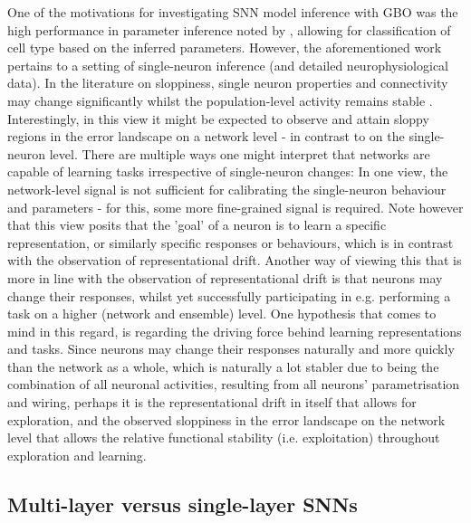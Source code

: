 \documentclass[mphil,deptreport,ianc]{infthesis} %
\begin{document}
One of the motivations for investigating SNN model inference with GBO was the high performance in parameter inference noted by \cite{Teeter2018a}, allowing for classification of cell type based on the inferred parameters.
However, the aforementioned work pertains to a setting of single-neuron inference (and detailed neurophysiological data).
In the literature on sloppiness, single neuron properties and connectivity may change significantly whilst the population-level activity remains stable \cite{Panas2015SloppinessNetworks}.
Interestingly, in this view it might be expected to observe and attain sloppy regions in the error landscape on a network level - in contrast to on the single-neuron level.
There are multiple ways one might interpret that networks are capable of learning tasks irrespective of single-neuron changes: 
In one view, the network-level signal is not sufficient for calibrating the single-neuron behaviour and parameters - for this, some more fine-grained signal is required. Note however that this view posits that the 'goal' of a neuron is to learn a specific representation, or similarly specific responses or behaviours, which is in contrast with the observation of representational drift.
Another way of viewing this that is more in line with the observation of representational drift is that neurons may change their responses, whilst yet successfully participating in e.g. performing a task on a higher (network and ensemble) level.
One hypothesis that comes to mind in this regard, is regarding the driving force behind learning representations and tasks.
Since neurons may change their responses naturally and more quickly than the network as a whole, which is naturally a lot stabler due to being the combination of all neuronal activities, resulting from all neurons' parametrisation and wiring, perhaps it is the representational drift in itself that allows for exploration, and the observed sloppiness in the error landscape on the network level that allows the relative functional stability (i.e. exploitation) throughout exploration and learning.


\subsection*{Multi-layer versus single-layer SNNs}
\end{document}
